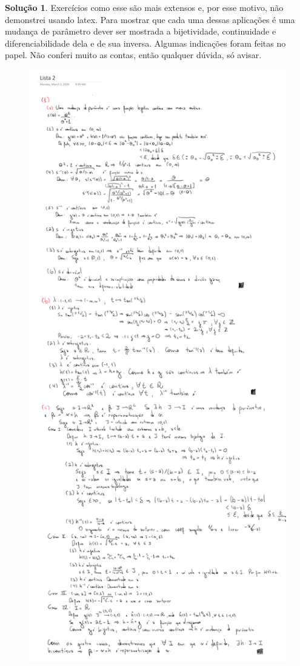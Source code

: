 \documentclass[a4paper,12pt]{article}
\theoremstyle{exer}
\theoremstyle{definition}
\newtheorem{solution}{Solução}
\theoremstyle{plain}
\begin{document}
\begin{solution}
    Exercícios como esse são mais extensos e, por esse motivo, não demonstrei
    usando latex. Para mostrar que cada uma dessas aplicações é uma mudança de
    parâmetro dever ser mostrada a bijetividade, continuidade e
    diferenciabilidade dela e de sua inversa. Algumas indicações foram feitas
    no papel. Não conferi muito as contas, então qualquer dúvida, só avisar.
    \begin{figure}
        \centering
        \includegraphics[width = \textwidth,trim=1.5in 24in 1in 3.6in, clip]{images/exe4.png}

\end{figure}
\end{solution}
\end{document}
